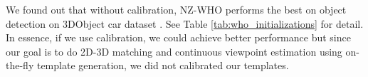 \documentclass[10pt,twocolumn,letterpaper]{article}
\begin{document}
We found out that without calibration, NZ-WHO performs the best on object
detection on 3DObject car dataset \cite{Savarese07}. See Table
\ref{tab:who_initializations} for detail. In essence, if we use calibration, we
could achieve better performance but since our goal is to do 2D-3D matching and
continuous viewpoint estimation using on-the-fly template generation, we did not
calibrated our templates.

\end{document}
